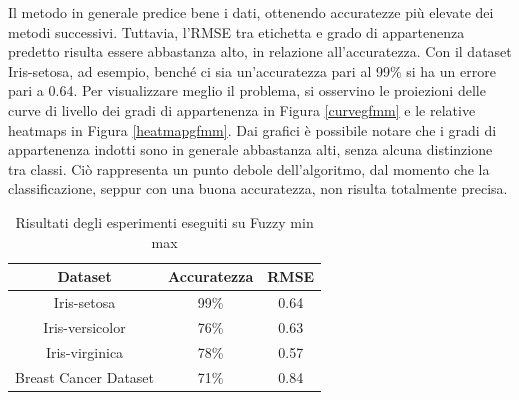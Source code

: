 \documentclass[11pt,  oneside, openany]{book}
\begin{document}
Il metodo in generale predice bene i dati, ottenendo accuratezze più elevate dei metodi successivi. Tuttavia, l'RMSE tra etichetta e grado di appartenenza predetto risulta essere abbastanza alto, in relazione all'accuratezza. Con il dataset Iris-setosa, ad esempio, benché ci sia un'accuratezza pari al 99\% si ha un errore pari a 0.64. Per visualizzare meglio il problema, si osservino le proiezioni delle curve di livello dei gradi di appartenenza in Figura \ref{curvegfmm} e le relative heatmaps in Figura \ref{heatmapgfmm}. 
Dai grafici è possibile notare che i gradi di appartenenza indotti sono in generale abbastanza alti, senza alcuna distinzione tra classi. Ciò rappresenta un punto debole dell'algoritmo, dal momento che la classificazione, seppur con una buona accuratezza, non risulta totalmente precisa. 

\begin{table} [h!]
      \begin{center}\begin{tabular}{ |c|c|c| } 
        \hline
        Dataset & Accuratezza & RMSE\\
        \hline
        Iris-setosa & 99\% & 0.64 \\
        \hline
        Iris-versicolor & 76\% & 0.63 \\
        \hline
        Iris-virginica & 78\% & 0.57 \\
        \hline
        Breast Cancer Dataset & 71\%  & 0.84 \\
        \hline                  
      \end{tabular}
    \end{center}
    \caption{Risultati degli esperimenti eseguiti su Fuzzy min max}
    \label{tab:fmm}  
    \end{table}
\end{document}
